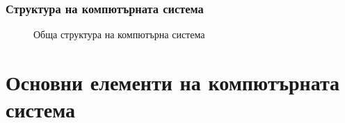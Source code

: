 \documentclass[ignorenonframetext, hyperref=unicode]{beamer}
\begin{document}
\begin{frame}
\frametitle{Структура на компютърната система}
\begin{figure}[h]
\center
{}
\caption{Обща структура на компютърна система}
\end{figure}
\end{frame}

\section{Основни елементи на компютърната система}
\end{document}
